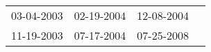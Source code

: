 \begin{supertabular}{llll}
 03-04-2003 &  02-19-2004 &  12-08-2004 \\
 11-19-2003 &  07-17-2004 &  07-25-2008 \\
\end{supertabular}

